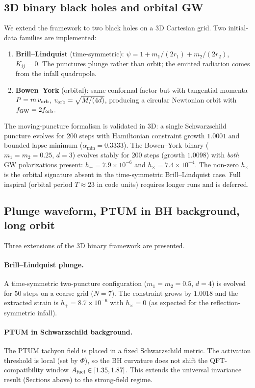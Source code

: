 \subsection{3D binary black holes and orbital GW}
We extend the framework to two black holes on a 3D Cartesian
grid. Two initial-data families are implemented:
\begin{enumerate}
\item \textbf{Brill--Lindquist} (time-symmetric): $\psi = 1 +
m_1/(2r_1) + m_2/(2r_2)$, $K_{ij} = 0$. The punctures plunge
rather than orbit; the emitted radiation comes from the
infall quadrupole.
\item \textbf{Bowen--York} (orbital): same conformal factor but
with tangential momenta $P = m\,v_{\rm orb}$, $v_{\rm orb} =
\sqrt{M/(4d)}$, producing a circular Newtonian orbit with
$f_{\rm GW} = 2 f_{\rm orb}$.
\end{enumerate}
The moving-puncture formalism is validated in 3D: a single
Schwarzschild puncture evolves for 200 steps with Hamiltonian
constraint growth $1.0001$ and bounded lapse minimum
($\alpha_{\min} = 0.3333$). The Bowen--York binary ($m_1 = m_2 =
0.25$, $d = 3$) evolves stably for 200 steps (growth $1.0098$)
with \emph{both} GW polarizations present: $h_+ = 7.9\times
10^{-6}$ and $h_\times = 7.4\times 10^{-4}$. The non-zero
$h_\times$ is the orbital signature absent in the
time-symmetric Brill--Lindquist case. Full inspiral (orbital
period $T \approx 23$ in code units) requires longer runs and is
deferred.

\subsection{Plunge waveform, PTUM in BH background, long orbit}
Three extensions of the 3D binary framework are presented.
\paragraph{Brill--Lindquist plunge.}
A time-symmetric two-puncture configuration ($m_1 = m_2 = 0.5$,
$d = 4$) is evolved for 50 steps on a coarse grid ($N = 7$). The
constraint grows by $1.0018$ and the extracted strain is
$h_+ = 8.7\times 10^{-6}$ with $h_\times = 0$ (as expected for
the reflection-symmetric infall).
\paragraph{PTUM in Schwarzschild background.}
The PTUM tachyon field is placed in a fixed Schwarzschild metric.
The activation threshold is local (set by $\Phi$), so the BH
curvature does not shift the QFT-compatibility window
$A_{\rm fuel} \in [1.35, 1.87]$. This extends the universal
invariance result (Sections above) to the strong-field regime.

